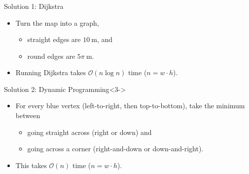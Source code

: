 \begin{frame}
    \frametitle{\problemtitle}
    \begin{block}{Solution 1: Dijkstra}
        \begin{itemize}
            \item<+-> Turn the map into a graph,
            \begin{itemize}
                \item straight edges are $10~\text{m}$, and
                \item round edges are $5\pi~\text{m}$.
            \end{itemize}
            \item<+-> Running Dijkstra takes $\mathcal O(n \log n)$ time ($n = w \cdot h$).
        \end{itemize}
    \end{block}
    \begin{block}{Solution 2: Dynamic Programming}<3->
        \begin{itemize}
            \item<+-> For every blue vertex (left-to-right, then top-to-bottom), take the minimum between
            \begin{itemize}
                \item going straight across (right or down) and
                \item going across a corner (right-and-down or down-and-right).
            \end{itemize}
            \item<+-> This takes $\mathcal O(n)$ time ($n = w \cdot h$).
        \end{itemize}
    \end{block}
    \solvestats
\end{frame}
